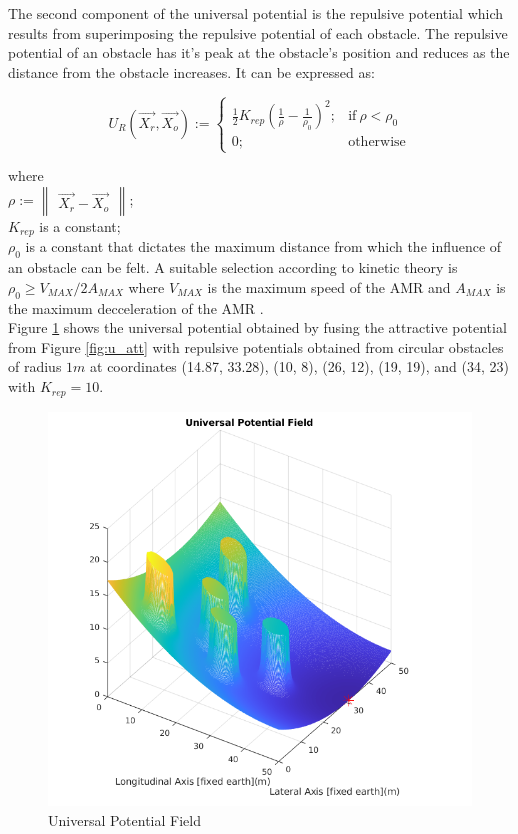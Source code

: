 \documentclass[a4paper, twocolumn]{article}
\begin{document}
The second component of the universal potential is the repulsive potential which results from superimposing 
the repulsive potential of each obstacle. The repulsive potential of an obstacle has it's peak at the obstacle's position and reduces as the 
distance from the obstacle increases. It can be expressed as:



$$
    U_{R}(\vec{X_{r}}, \vec{X_{o}}):= 
    \begin{cases}
        \frac{1}{2} K_{rep} {\left( \frac{1}{\rho} 
        - \frac{1}{\rho_{0}} \right)}^{2}; &   \text{if}\ \rho < \rho_{0} \\

        0; & \text{otherwise} 
    \end{cases}
$$

\noindent
where \\
$\rho := \begin{Vmatrix}\vec{X_{r}} - \vec{X_{o}}\end{Vmatrix}$; \\
$K_{rep}$ is a constant; \\
$\rho_{0}$ is a constant that dictates the maximum distance from which the influence of an obstacle can be felt.
\noindent
A suitable selection according to kinetic theory is $\rho_{0} \geq V_{MAX}/2 A_{MAX}$ where $V_{MAX}$ is the 
maximum speed of the AMR and $A_{MAX}$ is the maximum decceleration of the AMR \cite{rostami1}.\\

Figure \ref{fig:u_uni_plot} shows the universal potential obtained by fusing the attractive potential from Figure \ref{fig:u_att} with repulsive 
potentials obtained from circular obstacles of radius $1m$ at coordinates (14.87, 33.28), (10, 8), (26, 12), (19, 19), and (34, 23) 
with $K_{rep}= 10$.


\begin{figure}
    \centering
    \includegraphics[scale=0.45]{presentation/img/u_uni_plot.png}
    \caption{Universal Potential Field}
    \label{fig:u_uni_plot}
\end{figure}
\end{document}
